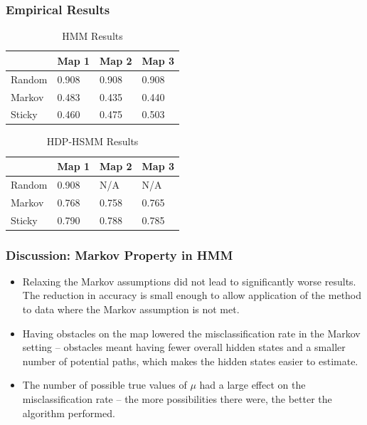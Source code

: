 \documentclass{beamer}
\begin{document}
\begin{frame}
    \frametitle{Empirical Results}
    \begin{table}[H]
    	\centering
    	\begin{tabular}{|l|l|l|l|}
    		\hline
    		& Map 1 & Map 2 & Map 3 \\
    		\hline
    		Random	& 0.908 & 0.908 & 0.908  \\
    		\hline
    		Markov & 0.483 & 0.435 & 0.440 \\
    		\hline
    		Sticky & 0.460 & 0.475& 0.503 \\
    		\hline
    	\end{tabular}
    	\caption{HMM Results}
    \end{table}
    
    \begin{table}[H]
    	\centering
    	\begin{tabular}{|l|l|l|l|}
    		\hline
    		& Map 1 & Map 2 & Map 3 \\
    		\hline
    		Random	& 0.908 & N/A  & N/A   \\
    		\hline
    		Markov & 0.768 & 0.758 & 0.765 \\
    		\hline
    		Sticky & 0.790 & 0.788 & 0.785  \\
    		\hline
    	\end{tabular}
    	\caption{HDP-HSMM Results}
    \end{table}
\end{frame}

\begin{frame}
	\frametitle{Discussion: Markov Property in HMM}
	\begin{itemize}
		\item Relaxing the Markov assumptions did not lead to significantly worse results. The reduction in accuracy is small enough to allow application of the method to data where the Markov assumption is not met.
		\item Having obstacles on the map lowered the misclassification rate in the Markov setting -- obstacles meant having fewer overall hidden states and a smaller number of potential paths, which makes the hidden states easier to estimate.
		\item The number of possible true values of $\mu$ had a large effect on the misclassification rate -- the more possibilities there were, the better the algorithm performed.
	\end{itemize}
\end{frame}
\end{document}
